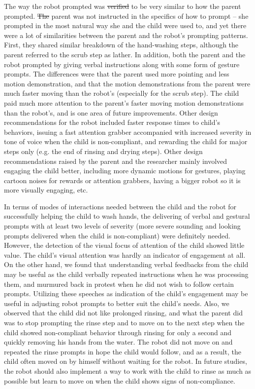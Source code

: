 \documentclass{ut-thesis}
\providecommand{\DIFaddtex}[1]{{\protect\color{blue}\uwave{#1}}} %
\providecommand{\DIFdeltex}[1]{{\protect\color{red}\sout{#1}}}                      %
\providecommand{\DIFaddbegin}{} %
\providecommand{\DIFaddend}{} %
\providecommand{\DIFdelbegin}{} %
\providecommand{\DIFdelend}{} %
\providecommand{\DIFadd}[1]{\texorpdfstring{\DIFaddtex{#1}}{#1}} %
\providecommand{\DIFdel}[1]{\texorpdfstring{\DIFdeltex{#1}}{}} %
\begin{document}
The way the robot prompted was \DIFdelbegin \DIFdel{verified }\DIFdelend \DIFaddbegin \DIFadd{observed }\DIFaddend to be very similar to how the parent prompted.  \DIFdelbegin \DIFdel{The }\DIFdelend \DIFaddbegin \DIFadd{Note that the }\DIFaddend parent was not instructed in the specifics of how to prompt -- she prompted in the most natural way she and the child were used to, and yet there were a lot of similarities between the parent and the robot's prompting patterns.  First, they shared similar breakdown of the hand-washing steps, although the parent referred to the scrub step as lather.  In addition, both the parent and the robot prompted by giving verbal instructions along with some form of gesture prompts.  The differences were that the parent used more pointing and less motion demonstration, and that the motion demonstrations from the parent were much faster moving than the robot's (especially for the scrub step).  The child paid much more attention to the parent's faster moving motion demonstrations than the robot's, and is one area of future improvements.  Other design recommendations for the robot included faster response times to child's behaviors, issuing a fast attention grabber accompanied with increased severity in tone of voice when the child is non-compliant, and rewarding the child for major steps only (e.g. the end of rinsing and drying steps).  Other design recommendations raised by the parent and the researcher mainly involved engaging the child better, including more dynamic motions for gestures, playing cartoon noises for rewards or attention grabbers, having a bigger robot so it is more visually engaging, etc.

In terms of modes of interactions needed between the child and the robot for successfully helping the child to wash hands, the delivering of verbal and gestural prompts with at least two levels of severity (more severe sounding and looking prompts delivered when the child is non-compliant) were definitely needed.  However, the detection of the visual focus of attention of the child showed little value.  The child's visual attention was hardly an indicator of engagement at all.  On the other hand, we found that understanding verbal feedbacks from the child may be useful as the child verbally repeated instructions when he was processing them, and murmured back in protest when he did not wish to follow certain prompts.  Utilizing these speeches as indication of the child's engagement may be useful in adjusting robot prompts to better suit the child's needs.  Also, we observed that the child did not like prolonged rinsing, and what the parent did was to stop prompting the rinse step and to move on to the next step when the child showed non-compliant behavior through rinsing for only a second and quickly removing his hands from the water.  The robot did not move on and repeated the rinse prompts in hope the child would follow, and as a result, the child often moved on by himself without waiting for the robot.  In future studies, the robot should also implement a way to work with the child to rinse as much as possible but learn to move on when the child shows signs of non-compliance.
\end{document}
